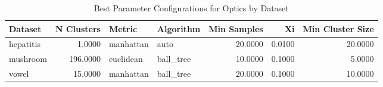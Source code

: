 \begin{table*}[ht!]
\caption{Best Parameter Configurations for Optics by Dataset}
\label{tab:best_configs_optics_config}
\begin{tabular}{lrllrrr}
Dataset & N Clusters & Metric & Algorithm & Min Samples & Xi & Min Cluster Size \\\midrule

hepatitis & 1.0000 & manhattan & auto & 20.0000 & 0.0100 & 20.0000 \\
mushroom & 196.0000 & euclidean & ball\_tree & 10.0000 & 0.1000 & 5.0000 \\
vowel & 15.0000 & manhattan & ball\_tree & 20.0000 & 0.1000 & 10.0000 \\
\end{tabular}
\end{table*}
